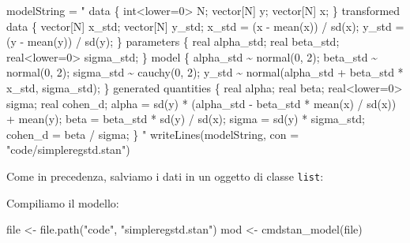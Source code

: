 \documentclass[
  10pt,
  italian,
  a4paper,
  extrafontsizes,onecolumn,openright
  ]{memoir}
\newenvironment{Shaded}{\begin{snugshade}}{\end{snugshade}}
\newcommand{\AttributeTok}[1]{\textcolor[rgb]{0.77,0.63,0.00}{#1}}
\newcommand{\FunctionTok}[1]{\textcolor[rgb]{0.00,0.00,0.00}{#1}}
\newcommand{\NormalTok}[1]{#1}
\newcommand{\OtherTok}[1]{\textcolor[rgb]{0.56,0.35,0.01}{#1}}
\newcommand{\SpecialCharTok}[1]{\textcolor[rgb]{0.00,0.00,0.00}{#1}}
\newcommand{\StringTok}[1]{\textcolor[rgb]{0.31,0.60,0.02}{#1}}
\begin{document}
\begin{Shaded}
\begin{Highlighting}[]
\NormalTok{modelString }\OtherTok{=} \StringTok{"}
\StringTok{data \{}
\StringTok{  int\textless{}lower=0\textgreater{} N;}
\StringTok{  vector[N] y;}
\StringTok{  vector[N] x;}
\StringTok{\}}
\StringTok{transformed data \{}
\StringTok{  vector[N] x\_std;}
\StringTok{  vector[N] y\_std;}
\StringTok{  x\_std = (x {-} mean(x)) / sd(x);}
\StringTok{  y\_std = (y {-} mean(y)) / sd(y);}
\StringTok{\}}
\StringTok{parameters \{}
\StringTok{  real alpha\_std;}
\StringTok{  real beta\_std;}
\StringTok{  real\textless{}lower=0\textgreater{} sigma\_std;}
\StringTok{\}}
\StringTok{model \{}
\StringTok{  alpha\_std \textasciitilde{} normal(0, 2);}
\StringTok{  beta\_std \textasciitilde{} normal(0, 2);}
\StringTok{  sigma\_std \textasciitilde{} cauchy(0, 2);}
\StringTok{  y\_std \textasciitilde{} normal(alpha\_std + beta\_std * x\_std, sigma\_std);}
\StringTok{\}}
\StringTok{generated quantities \{}
\StringTok{  real alpha;}
\StringTok{  real beta;}
\StringTok{  real\textless{}lower=0\textgreater{} sigma;}
\StringTok{  real cohen\_d;}
\StringTok{  alpha = sd(y) * (alpha\_std {-} beta\_std * mean(x) / sd(x))}
\StringTok{           + mean(y);}
\StringTok{  beta = beta\_std * sd(y) / sd(x);}
\StringTok{  sigma = sd(y) * sigma\_std;}
\StringTok{  cohen\_d = beta / sigma;}
\StringTok{\}}
\StringTok{"}
\FunctionTok{writeLines}\NormalTok{(modelString, }\AttributeTok{con =} \StringTok{"code/simpleregstd.stan"}\NormalTok{)}
\end{Highlighting}
\end{Shaded}

\noindent
Come in precedenza, salviamo i dati in un oggetto di classe \texttt{list}:

\begin{Shaded}
\end{Shaded}

\noindent
Compiliamo il modello:

\begin{Shaded}
\begin{Highlighting}[]
\NormalTok{file }\OtherTok{\textless{}{-}} \FunctionTok{file.path}\NormalTok{(}\StringTok{"code"}\NormalTok{, }\StringTok{"simpleregstd.stan"}\NormalTok{)}
\NormalTok{mod }\OtherTok{\textless{}{-}} \FunctionTok{cmdstan\_model}\NormalTok{(file)}
\end{Highlighting}
\end{Shaded}
\end{document}
